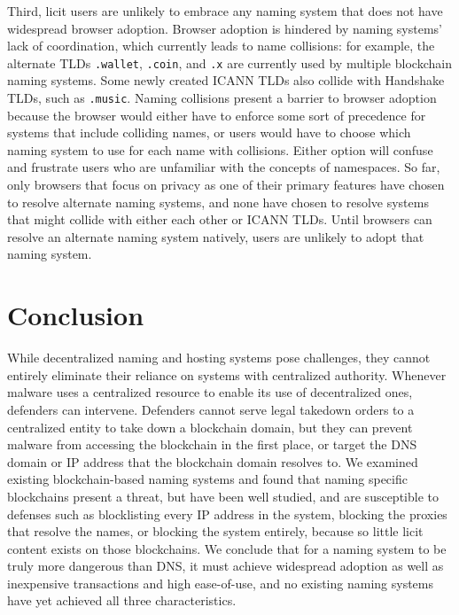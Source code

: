 \documentclass[10pt,sigconf,letterpaper]{acmart}
\begin{document}
Third, licit users are unlikely to embrace any naming system that does not have widespread browser 
adoption. Browser adoption is hindered by naming systems' lack of coordination, which currently leads 
to name collisions: for example, the alternate TLDs \texttt{.wallet}, \texttt{.coin}, and \texttt{.x} 
are currently used by multiple blockchain naming systems. Some newly created ICANN TLDs also collide 
with Handshake TLDs, such as \texttt{.music}. Naming collisions present a barrier to browser adoption 
because the browser would either have to enforce some sort of precedence for systems that include 
colliding names, or users would have to choose which naming system to use for each name with 
collisions. Either option will confuse and frustrate users who are unfamiliar with the concepts of 
namespaces. So far, only browsers that focus on privacy as one of their primary features have chosen 
to resolve alternate naming systems, and none have chosen to resolve systems that might collide with 
either each other or ICANN TLDs. Until browsers can resolve an alternate naming system natively, users 
are unlikely to adopt that naming system.


\section{Conclusion}

While decentralized naming and hosting systems pose challenges, they cannot 
entirely 
eliminate their reliance on systems with centralized authority. Whenever 
malware uses a centralized 
resource to enable its use of decentralized ones, defenders can intervene. 
Defenders cannot serve 
legal takedown orders to a centralized entity to take 
down a blockchain domain, but they can prevent malware from accessing the 
blockchain in the first 
place, or target the DNS domain or IP address that the blockchain domain 
resolves to. We examined existing blockchain-based naming systems and found that naming specific 
blockchains present a threat, but have been well studied, and are susceptible to defenses such as 
blocklisting every IP address in the system, blocking the proxies that resolve the names, or blocking 
the system entirely, because so little licit 
content exists on those blockchains. We conclude that for a naming system to be truly more dangerous 
than DNS, it must achieve widespread adoption as well as inexpensive transactions and high 
ease-of-use, and no existing naming systems have yet achieved all three characteristics. 
\end{document}
